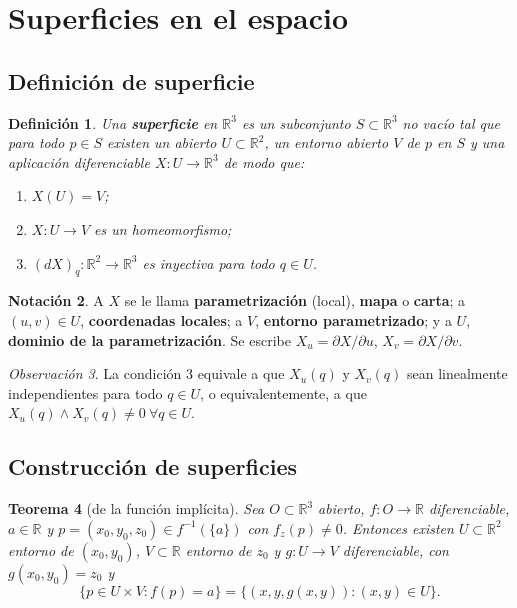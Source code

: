 \documentclass[11pt]{article}
\theoremstyle{plain}
\newtheorem{teorema}{Teorema}[section]
\newtheorem{definicion}[teorema]{Definición}
\theoremstyle{definition}
\newtheorem{notacion}[teorema]{Notación}
\theoremstyle{remark}
\newtheorem{observacion}[teorema]{Observación}
\begin{document}
\newpage
\section{Superficies en el espacio}

\subsection{Definición de superficie}

\begin{definicion}
Una \textbf{superficie} en $\mathbb{R}^3$ es un subconjunto $S\subset\mathbb{R}^3$ no vacío tal que para todo $p\in S$ existen un abierto $U\subset\mathbb{R}^2$, un entorno abierto $V$ de $p$ en $S$ y una aplicación diferenciable $X:U\to\mathbb{R}^3$ de modo que:
\begin{enumerate}
\item $X(U)=V$;
\item $X:U\to V$ es un homeomorfismo;
\item $(dX)_q:\mathbb{R}^2\to\mathbb{R}^3$ es inyectiva para todo $q\in U$.
\end{enumerate}
\end{definicion}

\begin{notacion}
A $X$ se le llama \textbf{parametrización} (local), \textbf{mapa} o \textbf{carta}; a $(u,v)\in U$, \textbf{coordenadas locales}; a $V$, \textbf{entorno parametrizado}; y a $U$, \textbf{dominio de la parametrización}. Se escribe $X_u=\partial X/\partial u$, $X_v=\partial X/\partial v$.
\end{notacion}

\begin{observacion}
La condición 3 equivale a que $X_u(q)$ y $X_v(q)$ sean linealmente independientes para todo $q\in U$, o equivalentemente, a que $X_u(q)\land X_v(q)\neq0\ \forall q\in U$.
\end{observacion}

\subsection{Construcción de superficies}

\begin{teorema}[de la función implícita]
Sea $O\subset\mathbb{R}^3$ abierto, $f:O\to\mathbb{R}$ diferenciable, $a\in\mathbb{R}$ y $p=(x_0,y_0,z_0)\in f^{-1}(\{a\})$ con $f_z(p)\neq0$. Entonces existen $U\subset\mathbb{R}^2$ entorno de $(x_0,y_0)$, $V\subset\mathbb{R}$ entorno de $z_0$ y $g:U\to V$ diferenciable, con $g(x_0,y_0)=z_0$ y
\[
\{p\in U\times V: f(p)=a\}=\{(x,y,g(x,y)):(x,y)\in U\}.
\]
\end{teorema}
\end{document}

